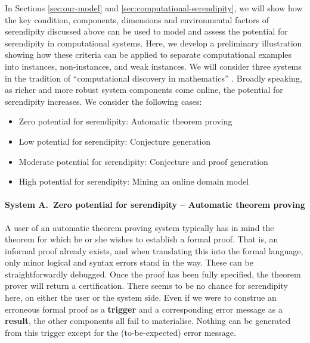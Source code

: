 In Sections \ref{sec:our-model} and
\ref{sec:computational-serendipity}, we will show how the key
condition, components, dimensions and environmental factors of
serendipity discussed above can be used to model and assess the
potential for serendipity in computational systems.
Here, we develop a preliminary illustration showing how these criteria can be
applied to separate computational examples into instances, non-instances, and
weak instances.
We will consider three systems in the tradition of ``computational
discovery in mathematics'' \cite{colton2007computational}.  Broadly speaking, as richer and more robust system components come online, the potential for serendipity increases.  We consider the following cases:

\begin{itemize}
\item Zero potential for serendipity: Automatic theorem proving
\item Low potential for serendipity: Conjecture generation
\item Moderate potential for serendipity: Conjecture and proof generation
\item High potential for serendipity: Mining an online domain model
\end{itemize}

\paragraph{System A.~Zero potential for serendipity -- Automatic theorem proving} 
A user of an automatic theorem proving system typically has in mind
the theorem for which he or she wishes to establish a formal proof.
That is, an informal proof already exists, and when translating this
into the formal language, only minor logical and syntax errors stand
in the way.  These can be straightforwardly debugged.  Once the proof
has been fully specified, the theorem prover will return a
certification.  There seems to be no chance for serendipity here, on
either the user or the system side.  Even if we were to construe an
erroneous formal proof as a \textbf{trigger} and a corresponding error
message as a \textbf{result}, the other components all fail to
materialise.  Nothing can be generated from this trigger except for
the (to-be-expected) error message.


